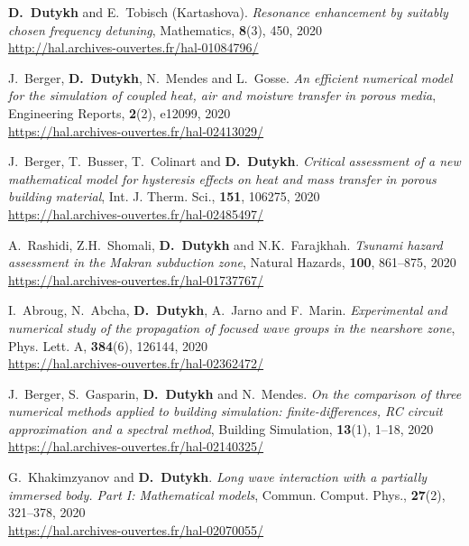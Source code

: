 \begin{etaremune}
  \item \textbf{D.~Dutykh} and E.~Tobisch (Kartashova). \textit{Resonance enhancement by suitably chosen frequency detuning}, Mathematics, \textbf{8}(3), 450, 2020 \\ %
  \url{http://hal.archives-ouvertes.fr/hal-01084796/}
  
  \item J.~Berger, \textbf{D.~Dutykh}, N.~Mendes and L.~Gosse. \textit{An efficient numerical model for the simulation of coupled heat, air and moisture transfer in porous media}, Engineering Reports, \textbf{2}(2), e12099, 2020 \\ %
  \url{https://hal.archives-ouvertes.fr/hal-02413029/}
  
  \item J.~Berger, T.~Busser, T.~Colinart and \textbf{D.~Dutykh}. \textit{Critical assessment of a new mathematical model for hysteresis effects on heat and mass transfer in porous building material}, Int. J. Therm. Sci., \textbf{151}, 106275, 2020 \\ %
  \url{https://hal.archives-ouvertes.fr/hal-02485497/}
  
  \item A.~Rashidi, Z.H.~Shomali, \textbf{D.~Dutykh} and N.K.~Farajkhah. \textit{Tsunami hazard assessment in the Makran subduction zone}, Natural Hazards, \textbf{100}, 861--875, 2020 \\ %
  \url{https://hal.archives-ouvertes.fr/hal-01737767/}
  
  \item I.~Abroug, N.~Abcha, \textbf{D.~Dutykh}, A.~Jarno and F.~Marin. \textit{Experimental and numerical study of the propagation of focused wave groups in the nearshore zone}, Phys. Lett. A, \textbf{384}(6), 126144, 2020 \\ %
  \url{https://hal.archives-ouvertes.fr/hal-02362472/}
  
  \item J.~Berger, S.~Gasparin, \textbf{D.~Dutykh} and N.~Mendes. \textit{On the comparison of three numerical methods applied to building simulation: finite-differences, RC circuit approximation and a spectral method}, Building Simulation, \textbf{13}(1), 1--18, 2020 \\ %
  \url{https://hal.archives-ouvertes.fr/hal-02140325/}
  
  \item G.~Khakimzyanov and \textbf{D.~Dutykh}. \textit{Long wave interaction with a partially immersed body. Part I: Mathematical models}, Commun. Comput. Phys., \textbf{27}(2), 321--378, 2020 \\ %
  \url{https://hal.archives-ouvertes.fr/hal-02070055/}
  

\end{etaremune}
